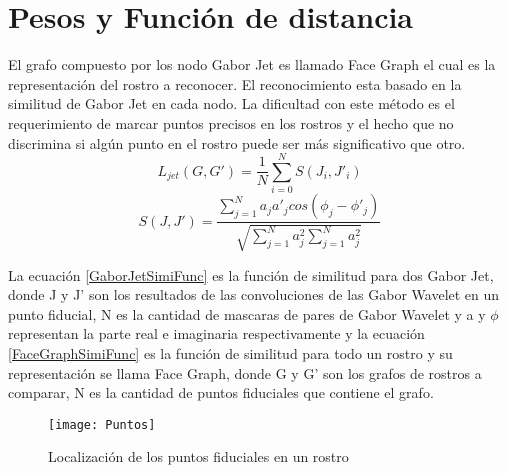 \section{Pesos y Función de distancia}
El grafo compuesto por los nodo Gabor Jet es llamado Face Graph el cual es la representación del rostro a reconocer.
El reconocimiento esta basado en la similitud de Gabor Jet en cada nodo. La dificultad con este método es el requerimiento de marcar puntos precisos en los rostros y el hecho que no discrimina si algún punto en el rostro puede ser más significativo que otro. 
\begin{equation}
L_{jet}(G,G')=\frac{1}{N}\sum_{i=0}^{N}S(J_{i},J'_{i})
\end{equation}
\begin{equation}
S(J,J')=\frac{\sum_{j=1}^{N}a_j a'_jcos(\phi_j-\phi'_j)}{\sqrt{\sum_{j=1}^{N}a_j^2 \sum_{j=1}^{N}a_j^2}}
\end{equation}

La ecuación \ref{GaborJetSimiFunc} es la función de similitud para dos Gabor Jet, donde J y J' son los resultados de las convoluciones de las Gabor Wavelet en un punto fiducial, N es la cantidad de mascaras de pares de Gabor Wavelet y a y $\phi$ representan la parte real e imaginaria respectivamente y la ecuación \ref{FaceGraphSimiFunc} es la función de similitud para todo un rostro y su representación se llama Face Graph, donde G y G' son los grafos de rostros a comparar, N es la cantidad de puntos fiduciales que contiene el grafo.

\begin{figure}[h]
	\center
    \label{Puntos}
	\texttt{[image: Puntos]}
    \caption{Localización de los puntos fiduciales en un rostro}
\end{figure}

